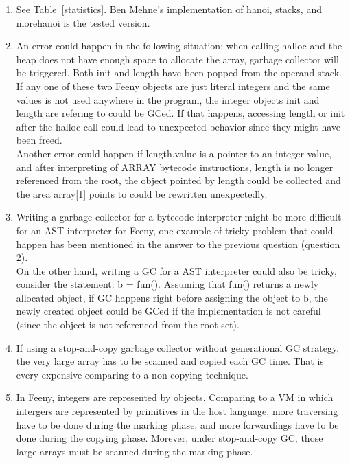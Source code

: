 \documentclass[notitlepage]{report}
\newcommand{\code}[1]{{\ttfamily #1}}
\begin{document}
\begin{enumerate}
	\item
		See Table~\ref{statistics}. Ben Mehne's implementation of hanoi, stacks, and morehanoi is the tested version.
	\item
		An error could happen in the following situation: when calling \code{halloc} and the heap does not have enough space to allocate the array, garbage collector will be triggered. Both \code{init} and \code{length} have been popped from the operand stack. If any one of these two Feeny objects are just literal integers and the same values is not used anywhere in the program, the integer objects \code{init} and \code{length} are refering to could be GCed. If that happens, accessing \code{length} or \code{init} after the \code{halloc} call could lead to unexpected behavior since they might have been freed. \\
		Another error could happen if \code{length.value} is a pointer to an integer value, and after interpreting of \code{ARRAY} bytecode instructions, \code{length} is no longer referenced from the root, the object pointed by \code{length} could be collected and the area \code{array[1]} points to could be rewritten unexpectedly.
	\item
		Writing a garbage collector for a bytecode interpreter might be more difficult for an AST interpreter for Feeny, one example of tricky problem that could happen has been mentioned in the answer to the previous question (question 2). \\
		On the other hand, writing a GC for a AST interpreter could also be tricky, consider the statement: \code{b = fun()}. Assuming that \code{fun()} returns a newly allocated object, if GC happens right before assigning the object to \code{b}, the newly created object could be GCed if the implementation is not careful (since the object is not referenced from the root set).
	\item
		If using a stop-and-copy garbage collector without generational GC strategy, the very large array has to be scanned and copied each GC time. That is every expensive comparing to a non-copying technique.
	\item
		In \code{Feeny}, integers are represented by objects. Comparing to a VM in which intergers are represented by primitives in the host language, more traversing have to be done during the marking phase, and more forwardings have to be done during the copying phase. Morever, under stop-and-copy GC, those large arrays must be scanned during the marking phase.

\end{enumerate}
\end{document}

